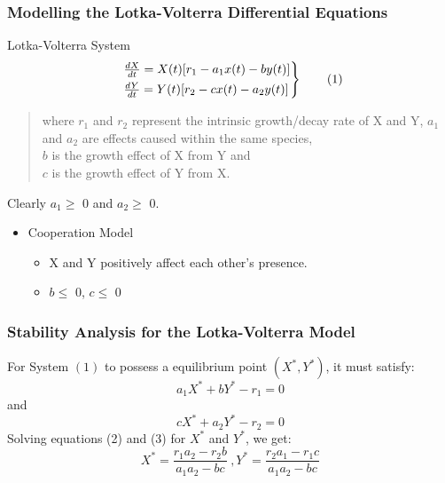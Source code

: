 \documentclass[xcolor={svgnames},hyperref={colorlinks,allcolors=Blue}]{beamer}
\begin{document}
\begin{frame}

\frametitle{Modelling the Lotka-Volterra Differential Equations}

\begin{block}{Lotka-Volterra System}
\begin{equation} 
	\begin{rcases}
		~\frac{dX}{dt} = X(t)[r_1-a_{1}x(t) - by(t)] \\
		~\frac{dY}{dt} = Y(t)[r_2-cx(t)-a_{2}y(t)] 
	\end{rcases}
	\tag{1}
\end{equation}
\begin{quote}
where $r_1$ and $r_2$ represent the intrinsic growth/decay rate of X and Y, $a_{1}$ and $a_{2}$ are effects caused within the same species, \\ $b$ is the growth effect of X from Y and \\ $c$ is the growth effect of Y from X. 
\end{quote}
\end{block}

Clearly $a_1 \geqslant$ 0 and $a_2 \geqslant$ 0.
\begin{itemize}
\item Cooperation Model
	\begin{itemize}
		\item X and Y positively affect each other's presence. 
		\item $b \leqslant$ 0, $c \leqslant$ 0
	\end{itemize}

\end{itemize}
\end{frame}

\begin{frame}
\frametitle{Stability Analysis for the Lotka-Volterra Model}
For System $(1)$ to possess a equilibrium point $(X^*,Y^*)$, it must satisfy: 
\\
\begin{equation}
	a_1X^* + bY^* - r_1 = 0
\end{equation}
and 
\begin{equation}
	cX^* + a_2Y^* - r_2 = 0
\end{equation}
\pause
Solving equations (2) and (3) for $X^* $ and $Y^*$, we get:
\begin{equation}
	~X^* = \frac{r_1a_2-r_2b}{a_1a_2-bc}~,Y^* = \frac{r_2a_1-r_1c}{a_1a_2-bc}~
\end{equation}
	
\end{frame}
\end{document}

